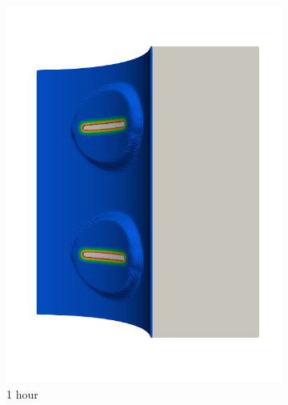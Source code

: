 \begin{figure}[!htb]
\begin{subfigure}[b]{0.2\textwidth}
    \includegraphics[width=\textwidth]{Chapter5/figures/spallation/seed_d_5}
    \caption{1 hour}
  \end{subfigure}
  \begin{subfigure}[b]{0.2\textwidth}
    \centering

\end{subfigure}
\end{figure}
